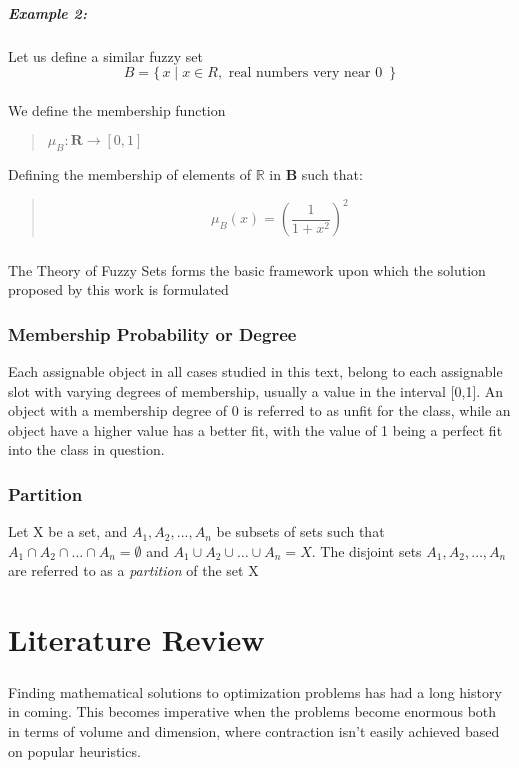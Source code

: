\documentclass[a4paper,openany]{book}
\begin{document}
					\paragraph{Example 2:}
						Let us define a similar fuzzy set 
						\[
						B = \{\, x \mid x \in R, \text{ real numbers very near 0 } \,\}
						\]
						\\We define the membership function
						\begin{verse}
							$\mu_B\colon \textbf{R} \to [0,1] $
						\end{verse}
						Defining the membership of elements of $\mathbb{R}$ in $\mathbf{B}$ such that:
						\begin{verse}
							\begin{equation}
								\mu_B(x) = \left( \frac{1}{1+x^2} \right)^{2}
							\end{equation}
						\end{verse}
					\paragraph{}
						The Theory of Fuzzy Sets forms the basic framework upon which the solution proposed by this work is formulated		
            \subsection{Membership Probability or Degree}
               Each assignable object in all cases studied in this text, belong to each assignable slot with varying degrees of membership, usually a value in the interval [0,1]. An object with a membership degree of 0 is referred to as unfit for the class, while an object have a higher value has a better fit, with the value of 1 being a perfect fit into the class in question.
            \subsection{Partition}
               Let X be a set, and $A_1, A_2,...,A_n$ be subsets of sets such that $A_1 \cap A_2 \cap \dots \cap A_n = \emptyset$ and $A_1 \cup A_2 \cup \dots \cup A_n = X$. The disjoint sets $A_1, A_2, \dots, A_n$ are referred to as a \textit{partition} of the set X
	\chapter{Literature Review}
		\paragraph{}
			Finding mathematical solutions to optimization problems has had a long history in coming. This becomes imperative when the problems become enormous both in terms of volume and dimension, where contraction isn't easily achieved based on popular heuristics.
\end{document}
